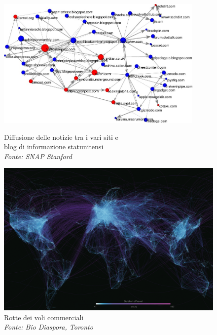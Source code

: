 \begin{frame}
\begin{figure}[h]
		\small 
		\begin{minipage}[t]{.45\textwidth}
			\centering
			\includegraphics[width=0.9\textwidth]{images/4_netinf}
			\small 
			\caption{Diffusione delle notizie tra i vari siti e \\blog di informazione statunitensi\\ \textit{Fonte: SNAP Stanford}}
		\end{minipage}\hfill
		\begin{minipage}[t]{.45\textwidth}
			\centering
			\includegraphics[width=1\textwidth]{images/7_flight}
			\small 
			\caption{Rotte dei voli commerciali  \\ \textit{Fonte: Bio Diaspora, Toronto}}
		\end{minipage}
	\end{figure}
\end{frame}

